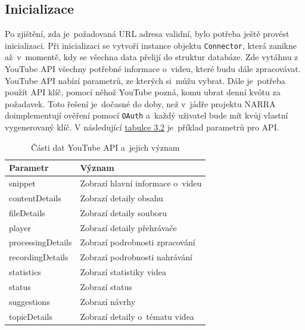 \subsection{Inicializace}
\par Po zjištění, zda je~požadovaná URL adresa validní, bylo potřeba ještě provést inicializaci. Při inicializaci se vytvoří instance objektu \texttt{Connector}, která zanikne až~v~momentě, kdy se všechna data přelijí do struktur databáze. Zde vytáhnu z YouTube API všechny potřebné informace o~videu, které budu dále zpracovávat. YouTube API nabízí parametrů, ze kterých si~můžu vybrat. Dále je~potřeba použít API klíč\cite{apistart}, pomocí něhož YouTube pozná, komu ubrat denní kvótu za požadavek. Toto řešení je~dočasné do doby, než v~jádře projektu NARRA doimplementují ověření pomocí \texttt{OAuth} a~každý uživatel bude mít kvůj vlastní vygenerovaný klíč. V následující \hyperlink{apiparams}{tabulce 3.2} je~příklad parametrů pro API.

\begin{table}[h!]
\hypertarget{apiparams}{}
\centering
\begin{tabular}{| l | l |}
\hline
\textbf{Parametr} & \textbf{Význam} \\
\hline
snippet & Zobrazí hlavní informace o~videu \\
\hline
contentDetails & Zobrazí detaily obsahu \\
\hline
fileDetails & Zobrazí detaily souboru \\
\hline
player & Zobrazí detaily přehrávače \\
\hline
processingDetails & Zobrazí podrobnosti zpracování \\
\hline
recordingDetails & Zobrazí podrobnosti nahrávání \\
\hline
statistics & Zobrazí statistiky videa \\
\hline
status & Zobrazí status \\
\hline
suggestions & Zobrazí návrhy \\
\hline
topicDetails & Zobrazí detaily o~tématu videa \\
\hline
\end{tabular}
\caption[Části dat YouTube API a~jejich význam]{Části dat YouTube API a~jejich význam}
\end{table}

